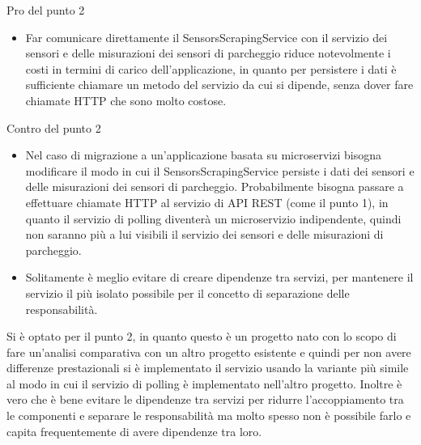 \leavevmode\newline
Pro del punto 2
\begin{itemize}
    \item Far comunicare direttamente il SensorsScrapingService con il servizio dei sensori e delle misurazioni dei sensori di parcheggio
        riduce notevolmente i costi in termini di carico dell'applicazione, in quanto per persistere i dati è sufficiente chiamare un
        metodo del servizio da cui si dipende, senza dover fare chiamate \gls{HTTP} che sono molto costose. 
\end{itemize}
\leavevmode\newline
Contro del punto 2
\begin{itemize}
    \item Nel caso di migrazione a un'applicazione basata su microservizi bisogna modificare il modo in cui il SensorsScrapingService 
        persiste i dati dei sensori
        e delle misurazioni dei sensori di parcheggio. Probabilmente bisogna passare a effettuare chiamate \gls{HTTP} al servizio di \gls{API} \gls{REST} (come il punto 1),
        in quanto il servizio di polling diventerà un microservizio indipendente, quindi non saranno più a lui visibili il servizio dei 
        sensori e delle misurazioni di parcheggio.
    \item Solitamente è meglio evitare di creare dipendenze tra servizi, per mantenere il servizio il più isolato possibile per il
        concetto di separazione delle responsabilità.
\end{itemize}
\leavevmode\newline
Si è optato per il punto 2, in quanto questo è un progetto nato con lo scopo di fare un'analisi comparativa con un altro progetto esistente
e quindi per non avere differenze prestazionali si è implementato il servizio usando la variante più simile al modo in cui il 
servizio di polling è implementato nell'altro progetto. Inoltre è vero che è bene evitare le dipendenze tra servizi per ridurre
l'accoppiamento tra le componenti e separare le responsabilità ma molto spesso non è possibile farlo e capita frequentemente
di avere dipendenze tra loro.

